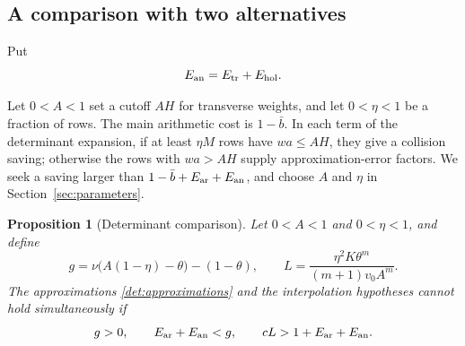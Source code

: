 \documentclass[11pt]{article}
\newtheorem{proposition}[theorem]{Proposition}
\theoremstyle{definition}
\theoremstyle{remark}
\numberwithin{equation}{section}
\begin{document}
\subsection{A comparison with two alternatives}

Put
\begin{equation}
 E_{\rm an}=E_{\rm tr}+E_{\rm hol}.
 \label{det:analytic-error}
\end{equation}

Let $0<A<1$ set a cutoff $AH$ for transverse weights, and let
$0<\eta<1$ be a fraction of rows. The main arithmetic cost is
$1-\bar b$. In each term of the determinant expansion, if at least
$\eta M$ rows have $wa\le AH$, they give a collision saving;
otherwise the rows with $wa>AH$ supply approximation-error factors.
We seek a saving larger than $1-\bar b+E_{\rm ar}+E_{\rm an}$, and
choose $A$ and $\eta$ in Section~\ref{sec:parameters}.

\begin{proposition}[Determinant comparison]\label{det:comparison}
Let $0<A<1$ and $0<\eta<1$, and define
\begin{equation}
 g=\nu\bigl(A(1-\eta)-\theta\bigr)-(1-\theta),
 \qquad
 L=\frac{\eta^2K\theta^m}{(m+1)v_0A^m}.
 \label{det:budgets}
\end{equation}
The approximations \eqref{det:approximations} and the interpolation
hypotheses cannot hold simultaneously if
\begin{equation}
 g>0,\qquad
 E_{\rm ar}+E_{\rm an}<g,
 \qquad
 cL>1+E_{\rm ar}+E_{\rm an}.
 \label{det:contradiction-conditions}
\end{equation}
\end{proposition}
\end{document}
